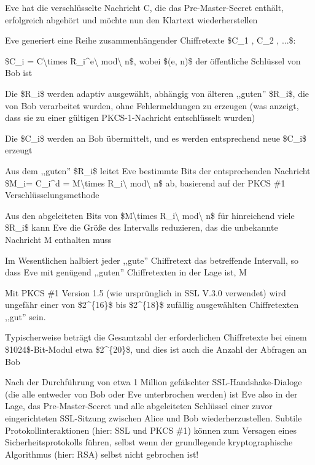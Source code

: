 \documentclass[a4paper]{article}
\begin{document}
\begin{multicols}{3}
\begin{itemize*}
\begin{itemize*}
\begin{itemize*}
                        \item Eve hat die verschlüsselte Nachricht C, die das Pre-Master-Secret enthält, erfolgreich abgehört und möchte nun den Klartext wiederherstellen
                        \item Eve generiert eine Reihe zusammenhängender Chiffretexte \$C\_1 , C\_2 , ...\$:
                        \begin{itemize*} \item \$C\_i = C\textbackslash times R\_i\^{}e\textbackslash{} mod\textbackslash{} n\$, wobei \$(e, n)\$ der öffentliche Schlüssel von Bob ist \item Die \$R\_i\$ werden adaptiv ausgewählt, abhängig von älteren ,,guten'' \$R\_i\$, die von Bob verarbeitet wurden, ohne Fehlermeldungen zu erzeugen (was anzeigt, dass sie zu einer gültigen PKCS-1-Nachricht entschlüsselt wurden) \item Die \$C\_i\$ werden an Bob übermittelt, und es werden entsprechend neue \$C\_i\$ erzeugt \item Aus dem ,,guten'' \$R\_i\$ leitet Eve bestimmte Bits der entsprechenden Nachricht \$M\_i= C\_i\^{}d = M\textbackslash times R\_i\textbackslash{} mod\textbackslash{} n\$ ab, basierend auf der PKCS \#1 Verschlüsselungsmethode \end{itemize*}
                        \item Aus den abgeleiteten Bits von \$M\textbackslash times R\_i\textbackslash{} mod\textbackslash{} n\$ für hinreichend viele \$R\_i\$ kann Eve die Größe des Intervalls reduzieren, das die unbekannte Nachricht M enthalten muss
                        \item Im Wesentlichen halbiert jeder ,,gute'' Chiffretext das betreffende Intervall, so dass Eve mit genügend ,,guten'' Chiffretexten in der Lage ist, M
                        \item Mit PKCS \#1 Version 1.5 (wie ursprünglich in SSL V.3.0 verwendet) wird ungefähr einer von \$2\^{}\{16\}\$ bis \$2\^{}\{18\}\$ zufällig ausgewählten Chiffretexten ,,gut'' sein.
                        \item Typischerweise beträgt die Gesamtzahl der erforderlichen Chiffretexte bei einem \$1024\$-Bit-Modul etwa \$2\^{}\{20\}\$, und dies ist auch die Anzahl der Abfragen an Bob
                        \item Nach der Durchführung von etwa 1 Million gefälschter SSL-Handshake-Dialoge (die alle entweder von Bob oder Eve unterbrochen werden) ist Eve also in der Lage, das Pre-Master-Secret und alle abgeleiteten Schlüssel einer zuvor eingerichteten SSL-Sitzung zwischen Alice und Bob wiederherzustellen. Subtile Protokollinteraktionen (hier: SSL und PKCS \#1) können zum Versagen eines Sicherheitsprotokolls führen, selbst wenn der grundlegende kryptographische Algorithmus (hier: RSA) selbst nicht gebrochen ist!

\end{itemize*}
\end{itemize*}
\end{itemize*}
\end{multicols}
\end{document}
